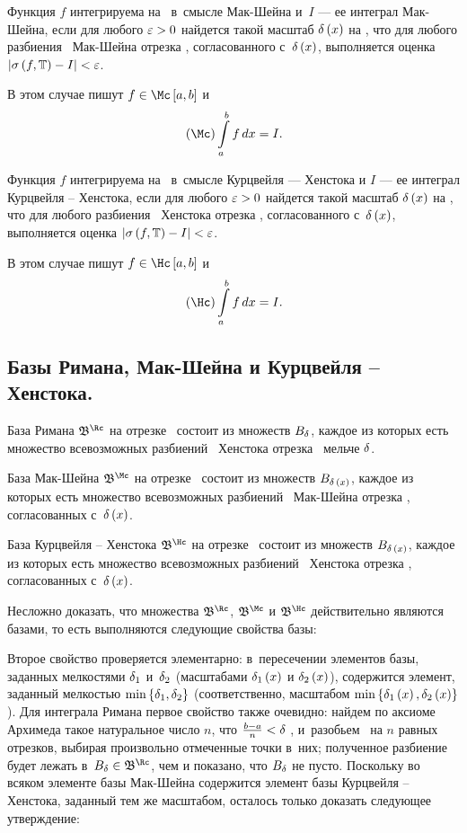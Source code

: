 \documentclass[draft]{article}
\begin{document}
\df Функция $f$ интегрируема на \ab\ в~смысле Мак-Шейна и~$I$ --- ее
интеграл Мак-Шейна, если для любого $\varepsilon > 0$ найдется такой масштаб
$\dex$ на \ab, что для любого разбиения \Tdixif\ Мак-Шейна отрезка
\ab, согласованного с~$\dex$, выполняется оценка
$\left|\isfT-I\right|<\ep$.

В этом случае пишут $f\ismacsh[a,b]$ и~$$\macsh\intabfdx=I.$$

\df Функция $f$ интегрируема на \ab\ в~смысле Курцвейля --- Хенстока
и $I$ --- ее интеграл Курцвейля -- Хенстока, если для любого $\varepsilon > 0$
найдется такой масштаб $\dex$ на \ab, что для любого разбиения
\Tdixif\ Хенстока отрезка \ab, согласованного с~$\dex$, выполняется
оценка $\left|\isfT-I\right|<\ep$.

В этом случае пишут $f\iskurzh[a,b]$ и~$$\kurzh\intabfdx=I.$$

\eject

\subsection{Базы Римана, Мак-Шейна и Курцвейля -- Хенстока.}

База Римана $\baseriman$ на отрезке \ab\ состоит из множеств
$B_\delta$, каждое из которых есть множество всевозможных разбиений
\Tdixif\ Хенстока отрезка \ab\ мельче $\delta$.

База Мак-Шейна $\basemacsh$ на отрезке \ab\ состоит из множеств
$B_\dexs$, каждое из которых есть множество всевозможных разбиений
\Tdixif\ Мак-Шейна отрезка \ab, согласованных с~$\dex$.

База Курцвейля -- Хенстока $\basekurzh$ на отрезке \ab\ состоит из
множеств $B_\dexs$, каждое из которых есть множество всевозможных
разбиений \Tdixif\ Хенстока отрезка \ab, согласованных с~$\dex$.

\bigskip

Несложно доказать, что множества $\baseriman$, $\basemacsh$ и
$\basekurzh$ действительно являются базами, то есть выполняются
следующие свойства базы:

 \bigskip

Второе свойство проверяется элементарно: в~пересечении элементов
базы, заданных мелкостями $\delta_1$ и~$\delta_2$ (масштабами $\de_1\atx$
и $\de_2\atx$), содержится элемент, заданный мелкостью
$\min \left\{\delta_1,\delta_2 \right\}$ (соответственно, масштабом
$\min \set{\de_1\atx,\de_2\atx}$). Для интеграла Римана первое
свойство также очевидно: найдем по аксиоме Архимеда такое
натуральное число $n$, что ${b-a\over n}<\delta$ , и~разобьем \ab\ на
$n$ равных отрезков, выбирая произвольно отмеченные точки в~них;
полученное разбиение будет лежать в~$B_\de\in\baseriman$, чем и
показано, что $B_\delta$ не пусто. Поскольку во всяком элементе базы
Мак-Шейна содержится элемент базы Курцвейля -- Хенстока, заданный
тем же масштабом, осталось только доказать следующее утверждение:
\end{document}
